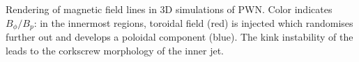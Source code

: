 \label{fig:spaghetti} Rendering of magnetic field lines in 3D simulations of PWN.  Color indicates $B_\phi/B_{p}$: in the innermost regions, toroidal field (red) is injected which randomises further out and develops a poloidal component (blue).  The kink instability of the leads to the corkscrew morphology of the inner jet.  